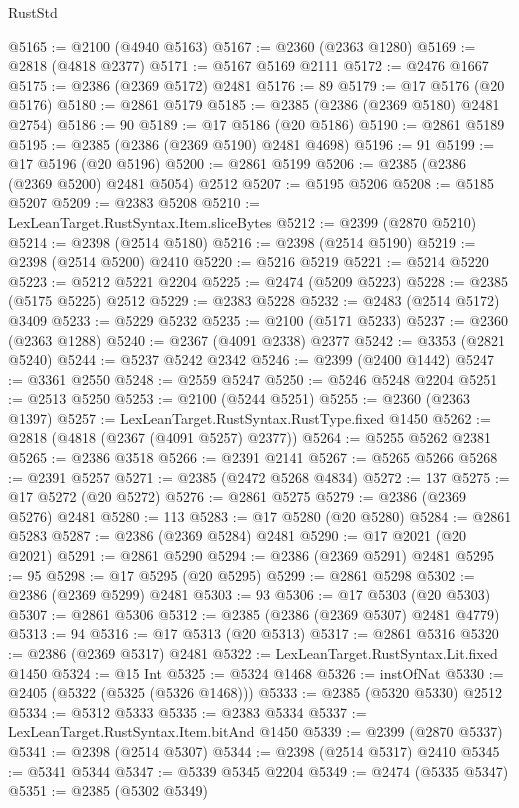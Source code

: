 \begin{lexlean}{RustStd}
\begin{coremodule}
{\begin{coremodule}
{{{{{{{{{{{{{{{{{{{{{{{{{{{{{{{{{{{{{{{{{{{{{{{{{{@5165 := @2100 (@4940 @5163)
@5167 := @2360 (@2363 @1280)
@5169 := @2818 (@4818 @2377)
@5171 := @5167 @5169 @2111
@5172 := @2476 @1667
@5175 := @2386 (@2369 @5172) @2481
@5176 := 89
@5179 := @17 @5176 (@20 @5176)
@5180 := @2861 @5179
@5185 := @2385 (@2386 (@2369 @5180) @2481 @2754)
@5186 := 90
@5189 := @17 @5186 (@20 @5186)
@5190 := @2861 @5189
@5195 := @2385 (@2386 (@2369 @5190) @2481 @4698)
@5196 := 91
@5199 := @17 @5196 (@20 @5196)
@5200 := @2861 @5199
@5206 := @2385 (@2386 (@2369 @5200) @2481 @5054) @2512
@5207 := @5195 @5206
@5208 := @5185 @5207
@5209 := @2383 @5208
@5210 := LexLeanTarget.RustSyntax.Item.sliceBytes
@5212 := @2399 (@2870 @5210)
@5214 := @2398 (@2514 @5180)
@5216 := @2398 (@2514 @5190)
@5219 := @2398 (@2514 @5200) @2410
@5220 := @5216 @5219
@5221 := @5214 @5220
@5223 := @5212 @5221 @2204
@5225 := @2474 (@5209 @5223)
@5228 := @2385 (@5175 @5225) @2512
@5229 := @2383 @5228
@5232 := @2483 (@2514 @5172) @3409
@5233 := @5229 @5232
@5235 := @2100 (@5171 @5233)
@5237 := @2360 (@2363 @1288)
@5240 := @2367 (@4091 @2338) @2377
@5242 := @3353 (@2821 @5240)
@5244 := @5237 @5242 @2342
@5246 := @2399 (@2400 @1442)
@5247 := @3361 @2550
@5248 := @2559 @5247
@5250 := @5246 @5248 @2204
@5251 := @2513 @5250
@5253 := @2100 (@5244 @5251)
@5255 := @2360 (@2363 @1397)
@5257 := LexLeanTarget.RustSyntax.RustType.fixed @1450
@5262 := @2818 (@4818 (@2367 (@4091 @5257) @2377))
@5264 := @5255 @5262 @2381
@5265 := @2386 @3518
@5266 := @2391 @2141
@5267 := @5265 @5266
@5268 := @2391 @5257
@5271 := @2385 (@2472 @5268 @4834)
@5272 := 137
@5275 := @17 @5272 (@20 @5272)
@5276 := @2861 @5275
@5279 := @2386 (@2369 @5276) @2481
@5280 := 113
@5283 := @17 @5280 (@20 @5280)
@5284 := @2861 @5283
@5287 := @2386 (@2369 @5284) @2481
@5290 := @17 @2021 (@20 @2021)
@5291 := @2861 @5290
@5294 := @2386 (@2369 @5291) @2481
@5295 := 95
@5298 := @17 @5295 (@20 @5295)
@5299 := @2861 @5298
@5302 := @2386 (@2369 @5299) @2481
@5303 := 93
@5306 := @17 @5303 (@20 @5303)
@5307 := @2861 @5306
@5312 := @2385 (@2386 (@2369 @5307) @2481 @4779)
@5313 := 94
@5316 := @17 @5313 (@20 @5313)
@5317 := @2861 @5316
@5320 := @2386 (@2369 @5317) @2481
@5322 := LexLeanTarget.RustSyntax.Lit.fixed @1450
@5324 := @15 Int
@5325 := @5324 @1468
@5326 := instOfNat
@5330 := @2405 (@5322 (@5325 (@5326 @1468)))
@5333 := @2385 (@5320 @5330) @2512
@5334 := @5312 @5333
@5335 := @2383 @5334
@5337 := LexLeanTarget.RustSyntax.Item.bitAnd @1450
@5339 := @2399 (@2870 @5337)
@5341 := @2398 (@2514 @5307)
@5344 := @2398 (@2514 @5317) @2410
@5345 := @5341 @5344
@5347 := @5339 @5345 @2204
@5349 := @2474 (@5335 @5347)
@5351 := @2385 (@5302 @5349)
}}}}}}}}}}}}}}}}}}}}}}}}}}}}}}}}}}}}}}}}}}}}}}}}}}
\end{coremodule}}
\end{coremodule}
\end{lexlean}
